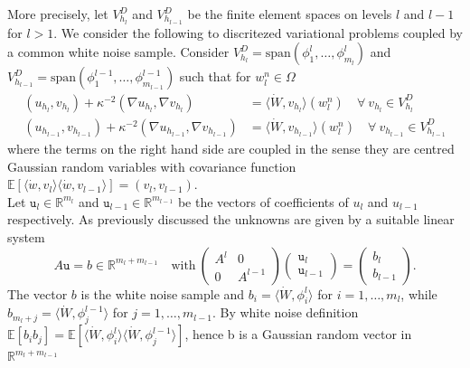 \documentclass[a4paper, 11pt, oneside]{scrartcl}
\begin{document}
More precisely, let \(V_{h_l}^D\) and \( V_{h_{l-1}}^D\)  be the finite element spaces on levels \(l \) and \(l-1\) for \(l>1\).
We consider the following to discritezed variational problems coupled by a common white noise sample. Consider \( V_{h_l}^D = \text{span}(\phi_1^l, \dots, \phi_{m_l}^l)\) and  \( V_{h_{l-1}}^D = \text{span}(\phi_1^{l-1}, \dots, \phi_{m_{l-1}}^{l-1} )\) such that for \( w_l^n \in \Omega\)
\begin{equation}
\begin{aligned}
(u_{h_l},v_{h_l}) + \kappa^{-2}( \nabla u_{h_l},\nabla v_{h_l}) &= \langle \dot{W}, v_{h_l} \rangle(w_l^n) \quad \forall \ v_{h_l} \in V_{h_l}^D \\
(u_{h_{l-1}},v_{h_{l-1}}) + \kappa^{-2}( \nabla u_{h_{l-1}},\nabla v_{h_{l-1}}) &= \langle \dot{W}, v_{h_{l-1}} \rangle(w_l^n) \quad \forall \ v_{h_{l-1}} \in V_{h_{l-1}}^D
\end{aligned}
\end{equation}
where the terms on the right hand side are coupled in the sense they are centred Gaussian random variables with covariance function \( \mathbb{E}[ \langle\dot{w},v_l\rangle \langle \dot{w}, v_{l-1}\rangle ]=(v_l,v_{l-1}).\)\\
Let \( \texttt{u}_l \in \mathbb{R}^{m_l}\) and \( \texttt{u}_{l-1} \in \mathbb{R}^{m_{l-1}}\) be the vectors of coefficients of \(u_l\) and \(u_{l-1}\) respectively. As previously discussed the unknowns are given by a suitable linear system
\begin{equation}
A \texttt{u} = b \in \mathbb{R}^{m_l + m_{l-1}} \quad \text{with} \ 
\begin{pmatrix}
A^l & 0 \\
0 & A^{l-1} 
\end{pmatrix} 
\begin{pmatrix}
\texttt{u}_l \\
\texttt{u}_{l-1}
\end{pmatrix} =
\begin{pmatrix}
b_l \\
b_{l-1}
\end{pmatrix}.
\end{equation}
The vector \( b\) is the white noise sample and \( b_i = \langle \dot{W}, \phi_i^l \rangle \) for \( i = 1, \dots, m_l \), while \( b_{m_l+j} =  \langle \dot{W}, \phi_j^{l-1} \rangle \) for \( j = 1, \dots, m_{l-1}. \)
By white noise definition \( \mathbb{E}[ b_i b_j] = \mathbb{E}[\langle \dot{W}, \phi_i^l \rangle \langle \dot{W}, \phi_j^{l-1} \rangle]  \), hence b is a Gaussian random vector in \( \mathbb{R}^{m_l + m_{l-1}}\)
\end{document}
